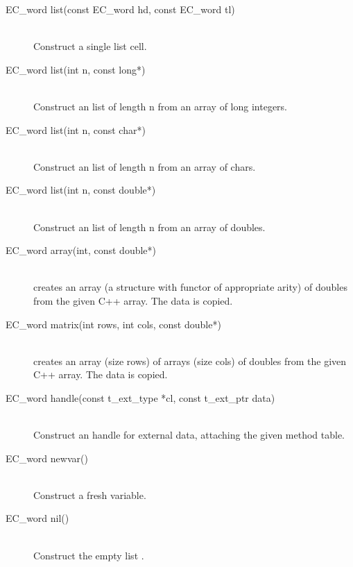 \begin{description}
\item[EC_word list(const EC_word hd, const EC_word tl)]\ \\
	Construct a single {\eclipse} list cell.

\item[EC_word list(int n, const long*)]\ \\
	Construct an {\eclipse} list of length n from an array of long integers.

\item[EC_word list(int n, const char*)]\ \\
	Construct an {\eclipse} list of length n from an array of chars.

\item[EC_word list(int n, const double*)]\ \\
	Construct an {\eclipse} list of length n from an array of doubles.

\item[EC_word array(int, const double*)]\ \\
	creates an {\eclipse} array (a structure with functor \nil of
	appropriate arity) of doubles from the given C++ array.
	The data is copied.

\item[EC_word matrix(int rows, int cols, const double*)]\ \\
	creates an {\eclipse} array (size rows) of arrays (size cols) of doubles
	from the given C++ array.  The data is copied.

\item[EC_word handle(const t_ext_type *cl, const t_ext_ptr data)]\ \\
	Construct an {\eclipse} handle for external data, attaching the
	given method table.

\item[EC_word newvar()]\ \\
	Construct a fresh {\eclipse} variable.

\item[EC_word nil()]\ \\
	Construct the empty list \nil.
\end{description}

